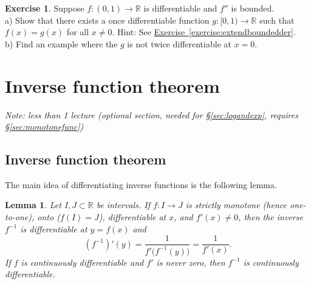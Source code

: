 \documentclass[12pt]{book}
\newcommand{\R}{{\mathbb{R}}}
\newcommand{\sectionnotes}[1]{\noindent \emph{Note: #1} \medskip \par}
\newcommand{\sectionnewpage}{\clearpage}
\theoremstyle{plain}
\newtheorem{lemma}[thm]{Lemma}
\theoremstyle{remark}
\theoremstyle{definition}
\theoremstyle{exercise}
\newtheorem{exercise}{Exercise}[section]
\theoremstyle{example}
\newcommand{\sectionref}[1]{\hyperref[#1]{\S\ref*{#1}}}
\newcommand{\exerciseref}[1]{\hyperref[#1]{Exercise~\ref*{#1}}}
\begin{document}
\begin{exercise} \label{exercise:extendboundedder2}
Suppose $f \colon (0,1) \to \R$ is differentiable and $f''$
is bounded.\\
a) Show that there exists a once differentiable function $g \colon [0,1) \to \R$
such that $f(x) = g(x)$ for all $x \not= 0$.  Hint: 
See
\exerciseref{exercise:extendboundedder}.
\\
b) Find an example where the $g$ is not twice differentiable at $x=0$.
\end{exercise}


\sectionnewpage
\section{Inverse function theorem}
\label{sec:ift}

\sectionnotes{less than 1 lecture (optional section, needed for
\sectionref{sec:logandexp}, requires 
\sectionref{sec:monotonefunc})}

\subsection{Inverse function theorem}

The main idea of differentiating inverse functions is the following lemma.

\begin{lemma} \label{lemma:ift}
Let $I,J \subset \R$ be intervals.
If $f \colon I \to J$ is strictly monotone (hence one-to-one),
onto ($f(I) = J$),
differentiable at $x$, and $f'(x) \not= 0$,
then the inverse 
$f^{-1}$ is differentiable at $y = f(x)$ and
\begin{equation*}
(f^{-1})'(y) = \frac{1}{f'\bigl( f^{-1}(y) \bigr)} = \frac{1}{f'(x)} .
\end{equation*}
If $f$ is continuously differentiable and $f'$ is never zero, then $f^{-1}$
is continuously differentiable.
\end{lemma}
\end{document}
